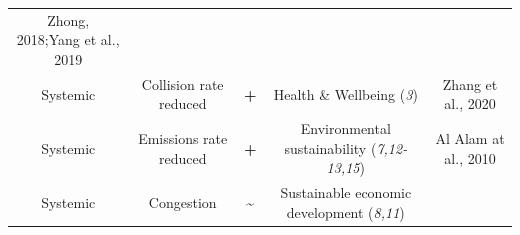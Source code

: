 \documentclass[
]{book}
\begin{document}
\begin{longtable}[]{@{}ccccc@{}}
\begin{minipage}[t]{0.17\columnwidth}
Zhong, 2018;Yang et al., 2019\strut
\end{minipage}\tabularnewline
\begin{minipage}[t]{0.17\columnwidth}\centering
Systemic\strut
\end{minipage} & \begin{minipage}[t]{0.16\columnwidth}\centering
Collision rate reduced\strut
\end{minipage} & \begin{minipage}[t]{0.17\columnwidth}\centering
\textbf{+}\strut
\end{minipage} & \begin{minipage}[t]{0.17\columnwidth}\centering
Health \& Wellbeing (\emph{3})\strut
\end{minipage} & \begin{minipage}[t]{0.17\columnwidth}\centering
Zhang et al., 2020\strut
\end{minipage}\tabularnewline
\begin{minipage}[t]{0.17\columnwidth}\centering
Systemic\strut
\end{minipage} & \begin{minipage}[t]{0.16\columnwidth}\centering
Emissions rate reduced\strut
\end{minipage} & \begin{minipage}[t]{0.17\columnwidth}\centering
\textbf{+}\strut
\end{minipage} & \begin{minipage}[t]{0.17\columnwidth}\centering
Environmental sustainability (\emph{7,12-13,15})\strut
\end{minipage} & \begin{minipage}[t]{0.17\columnwidth}\centering
Al Alam at al., 2010\strut
\end{minipage}\tabularnewline
\begin{minipage}[t]{0.17\columnwidth}\centering
Systemic\strut
\end{minipage} & \begin{minipage}[t]{0.16\columnwidth}\centering
Congestion\strut
\end{minipage} & \begin{minipage}[t]{0.17\columnwidth}\centering
\textbf{\textasciitilde{}}\strut
\end{minipage} & \begin{minipage}[t]{0.17\columnwidth}\centering
Sustainable economic development (\emph{8,11})\strut
\end{minipage} & \begin{minipage}[t]{0.17\columnwidth}\centering

\end{minipage}
\end{longtable}
\end{document}
